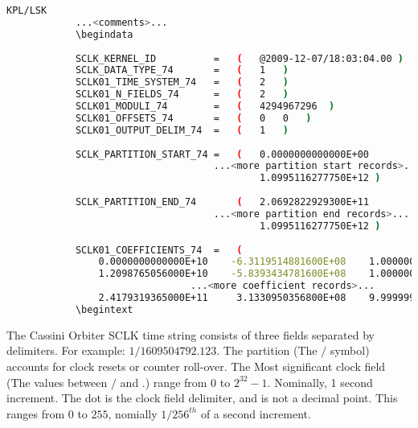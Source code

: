 \documentclass[crop=false,class=article,oneside]{standalone}
\begin{document}
            \begin{lstlisting}[language=bash,basicstyle=\footnotesize]
            KPL/LSK
            ...<comments>...
            \begindata
            
            SCLK_KERNEL_ID          =   (   @2009-12-07/18:03:04.00 )
            SCLK_DATA_TYPE_74       =   (   1   )
            SCLK01_TIME_SYSTEM_74   =   (   2   )
            SCLK01_N_FIELDS_74      =   (   2   )
            SCLK01_MODULI_74        =   (   4294967296  )
            SCLK01_OFFSETS_74       =   (   0   0   )
            SCLK01_OUTPUT_DELIM_74  =   (   1   )
            
            SCLK_PARTITION_START_74 =   (   0.0000000000000E+00
                                    ...<more partition start records>...
                                            1.0995116277750E+12 )
            
            SCLK_PARTITION_END_74       (   2.0692822929300E+11
                                    ...<more partition end records>...
                                            1.0995116277750E+12 )
            
            SCLK01_COEFFICIENTS_74  =   (
                0.0000000000000E+10    -6.3119514881600E+08    1.0000000000000E+10
                1.2098765056000E+10    -5.8393434781600E+08    1.0000000000000E+10
                                ...<more coefficient records>...
                2.4179319365000E+11     3.1330950356800E+08    9.9999997500000E+-01 )
            \begintext
            \end{lstlisting}
            \begin{example}
            The Cassini Orbiter SCLK time string consists of three fields separated by delimiters. For example: $1/1609504792.123$. The partition (The $/$ symbol) accounts for clock resets or counter roll-over. The Most significant clock field (The values between $/$ and $.$) range from $0$ to $2^{32}-1$. Nominally, 1 second increment. The dot is the clock field delimiter, and is not a decimal point. This ranges from $0$ to $255$, nomially $1/256^{th}$ of a second increment.
            \end{example}
\end{document}
